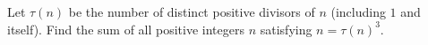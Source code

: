 Let $\tau(n)$ be the number of distinct positive divisors of $n$ (including $1$ and itself). Find the sum of all positive integers $n$ satisfying $n=\tau(n)^3.$
